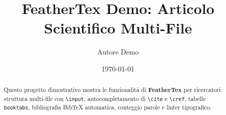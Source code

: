 \documentclass[a4paper,11pt]{article}
\title{FeatherTex Demo: Articolo Scientifico Multi-File}
\author{Autore Demo}
\date{\today}
\begin{document}
\maketitle

\begin{abstract}
Questo progetto dimostrativo mostra le funzionalità di \textbf{FeatherTex} per ricercatori:
struttura multi-file con \texttt{\textbackslash input}, autocompletamento di \texttt{\textbackslash cite} e
\texttt{\textbackslash cref}, tabelle \texttt{booktabs}, bibliografia BibTeX automatica,
conteggio parole e linter tipografico.
\end{abstract}






\end{document}
